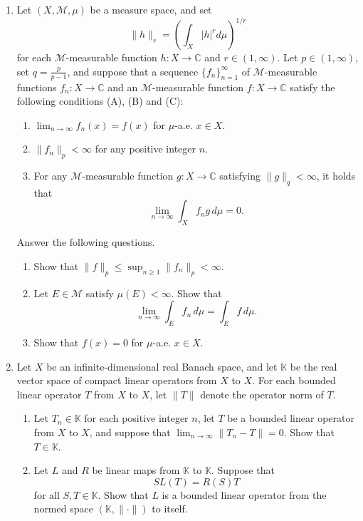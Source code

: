\documentclass{article}
\begin{document}
\begin{enumerate}[label=\fbox{\arabic*}]
  \item Let $(X, \mathcal{M}, \mu)$ be a measure space, and set
        \[
          \|h\|_r = \left( \int_X |h|^r d\mu \right)^{1/r}
        \]
        for each $\mathcal{M}$-measurable function $h: X \to \mathbb{C}$ and $r \in (1, \infty)$. Let $p \in (1, \infty)$, set $q = \frac{p}{p-1}$, and suppose that a sequence $\{f_n\}_{n=1}^\infty$ of $\mathcal{M}$-measurable functions $f_n: X \to \mathbb{C}$ and an $\mathcal{M}$-measurable function $f: X \to \mathbb{C}$ satisfy the following conditions (A), (B) and (C):
        \begin{enumerate}[label=({\Alph*})]
          \item $\lim_{n\to\infty} f_n(x) = f(x)$ for $\mu$-a.e. $x \in X$.
          \item $\|f_n\|_p < \infty$ for any positive integer $n$.
          \item For any $\mathcal{M}$-measurable function $g: X \to \mathbb{C}$ satisfying $\|g\|_q < \infty$, it holds that
                \[
                  \lim_{n\to\infty} \int_X f_n g \, d\mu = 0.
                \]
        \end{enumerate}
        Answer the following questions.
        \begin{enumerate}[label=(\arabic*)]
          \item Show that $\|f\|_p \le \sup_{n \ge 1} \|f_n\|_p < \infty$.
          \item Let $E \in \mathcal{M}$ satisfy $\mu(E) < \infty$. Show that
                \[
                  \lim_{n\to\infty} \int_E f_n \, d\mu = \int_E f \, d\mu.
                \]
          \item Show that $f(x) = 0$ for $\mu$-a.e. $x \in X$.
        \end{enumerate}

  \item Let $X$ be an infinite-dimensional real Banach space, and let $\mathbb{K}$ be the real vector space of compact linear operators from $X$ to $X$. For each bounded linear operator $T$ from $X$ to $X$, let $\|T\|$ denote the operator norm of $T$.
        \begin{enumerate}[label=(\arabic*)]
          \item Let $T_n \in \mathbb{K}$ for each positive integer $n$, let $T$ be a bounded linear operator from $X$ to $X$, and suppose that $\lim_{n\to\infty} \|T_n - T\| = 0$. Show that $T \in \mathbb{K}$.
          \item Let $L$ and $R$ be linear maps from $\mathbb{K}$ to $\mathbb{K}$. Suppose that
                \[
                  S L(T) = R(S) T
                \]
                for all $S, T \in \mathbb{K}$. Show that $L$ is a bounded linear operator from the normed space $(\mathbb{K}, \|\cdot\|)$ to itself.
        \end{enumerate}


\end{enumerate}
\end{document}
